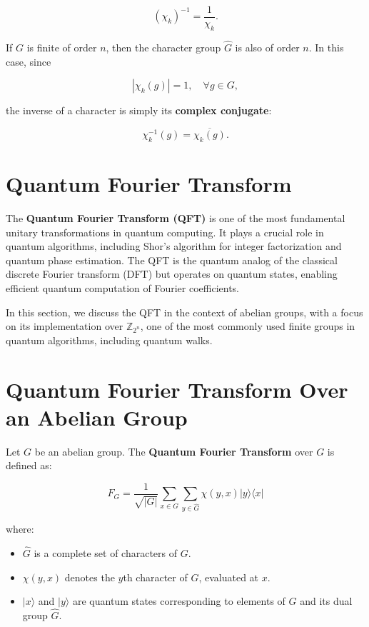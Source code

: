 \documentclass[11pt]{article}
\theoremstyle{definition}
\begin{document}
\[
(\chi_k)^{-1} = \frac{1}{\chi_k}.
\]

If \( G \) is finite of order \( n \), then the character group \( \hat{G} \) is also of order \( n \). In this case, since  

\[
|\chi_k(g)| = 1, \quad \forall g \in G,
\]

the inverse of a character is simply its \textbf{complex conjugate}:

\[
\chi_k^{-1}(g) = \overline{\chi_k(g)}.
\]


\section{Quantum Fourier Transform}

The \textbf{Quantum Fourier Transform (QFT)} is one of the most fundamental unitary transformations in quantum computing. It plays a crucial role in quantum algorithms, including Shor’s algorithm for integer factorization and quantum phase estimation. The QFT is the quantum analog of the classical discrete Fourier transform (DFT) but operates on quantum states, enabling efficient quantum computation of Fourier coefficients.

In this section, we discuss the QFT in the context of abelian groups, with a focus on its implementation over \( \mathbb{Z}_{2^n} \), one of the most commonly used finite groups in quantum algorithms, including quantum walks.

\section{Quantum Fourier Transform Over an Abelian Group}

Let \( G \) be an abelian group. The \textbf{Quantum Fourier Transform} over \( G \) is defined as:

\[
F_G = \frac{1}{\sqrt{|G|}} \sum_{x \in G} \sum_{y \in \hat{G}} \chi(y,x) | y \rangle \langle x |
\]

where:

\begin{itemize}
    \item \( \hat{G} \) is a complete set of characters of \( G \).
    \item \( \chi(y,x) \) denotes the \( y \)th character of \( G \), evaluated at \( x \).
    \item \( |x\rangle \) and \( |y\rangle \) are quantum states corresponding to elements of \( G \) and its dual group \( \hat{G} \).
\end{itemize}
\end{document}
